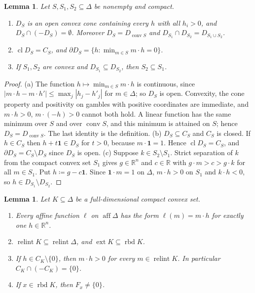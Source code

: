 \documentclass[11pt]{article}
\newcommand{\R}{\mathbb{R}}
\newcommand{\one}{\mathbf{1}}
\DeclareMathOperator{\conv}{conv}
\DeclareMathOperator{\relint}{relint}
\DeclareMathOperator{\rbd}{rbd}
\DeclareMathOperator{\aff}{aff}
\DeclareMathOperator{\ext}{ext}
\DeclareMathOperator{\cl}{cl}
\theoremstyle{plain}
\newtheorem{lemma}[theorem]{Lemma}
\theoremstyle{definition}
\theoremstyle{remark}
\begin{document}
\begin{lemma}\label{lem:D}
Let $S,S_1,S_2\subseteq\Delta$ be nonempty and compact.
\begin{enumerate}[label=(\alph*)]
  \item $D_S$ is an open convex cone containing every $h$ with all $h_i>0$, and
  $D_S\cap(-D_S)=\emptyset$. Moreover $D_S=D_{\conv S}$ and $D_{S_1}\cap D_{S_2}
  =D_{S_1\cup S_2}$.
  \item $\cl D_S=C_S$, and $\partial D_S=\{h:\min_{m\in S}m\cdot h=0\}$.
  \item If $S_1,S_2$ are convex and $D_{S_1}\subseteq D_{S_2}$, then $S_2\subseteq S_1$.
\end{enumerate}
\end{lemma}

\begin{proof}
(a) The function $h\mapsto\min_{m\in S}m\cdot h$ is continuous, since $|m\cdot h-m\cdot
h'|\le\max_j|h_j-h'_j|$ for $m\in\Delta$; so $D_S$ is open. Convexity, the cone property
and positivity on gambles with positive coordinates are immediate, and $m\cdot h>0$,
$m\cdot(-h)>0$ cannot both hold. A linear function has the same minimum over $S$ and
over $\conv S$, and this minimum is attained on $S$; hence $D_S=D_{\conv S}$. The last
identity is the definition.
(b) $D_S\subseteq C_S$ and $C_S$ is closed. If $h\in C_S$ then $h+t\one\in D_S$ for
$t>0$, because $m\cdot\one=1$. Hence $\cl D_S=C_S$, and $\partial D_S=C_S\setminus D_S$
since $D_S$ is open.
(c) Suppose $k\in S_2\setminus S_1$. Strict separation of $k$ from the compact convex set
$S_1$ gives $g\in\R^n$ and $c\in\R$ with $g\cdot m>c>g\cdot k$ for all $m\in S_1$. Put
$h\coloneqq g-c\one$. Since $\one\cdot m=1$ on $\Delta$, $m\cdot h>0$ on $S_1$ and
$k\cdot h<0$, so $h\in D_{S_1}\setminus D_{S_2}$.
\end{proof}

\begin{lemma}\label{lem:fulldim}
Let $K\subseteq\Delta$ be a full-dimensional compact convex set.
\begin{enumerate}[label=(\alph*)]
  \item Every affine function $\ell$ on $\aff\Delta$ has the form $\ell(m)=m\cdot h$ for
  exactly one $h\in\R^n$.
  \item $\relint K\subseteq\relint\Delta$, and $\ext K\subseteq\rbd K$.
  \item If $h\in C_K\setminus\{0\}$, then $m\cdot h>0$ for every $m\in\relint K$. In
  particular $C_K\cap(-C_K)=\{0\}$.
  \item If $x\in\rbd K$, then $F_x\neq\{0\}$.
\end{enumerate}
\end{lemma}
\end{document}

